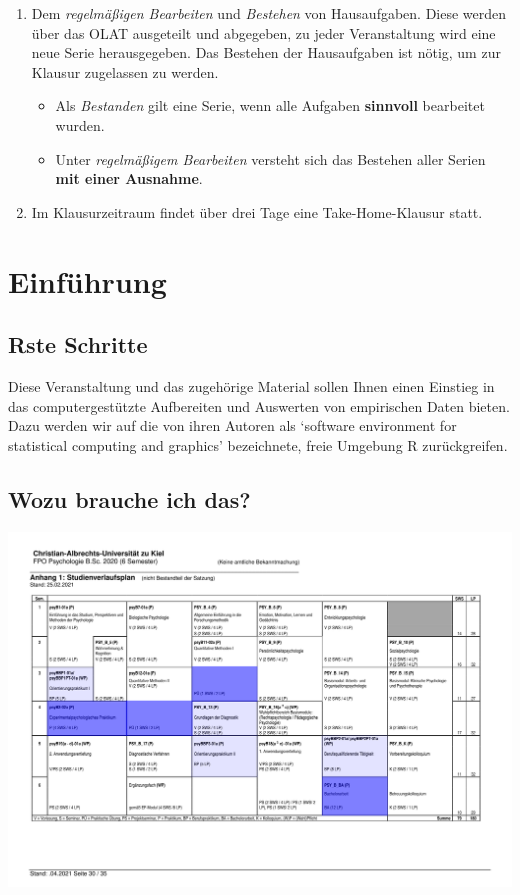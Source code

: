 \documentclass[
]{book}
\providecommand{\tightlist}{%
  \setlength{\itemsep}{0pt}\setlength{\parskip}{0pt}}
\begin{document}
\begin{enumerate}
\def\labelenumi{\arabic{enumi}.}
\tightlist
\item
  Dem \emph{regelmäßigen Bearbeiten} und \emph{Bestehen} von Hausaufgaben. Diese werden über das OLAT ausgeteilt und abgegeben, zu jeder Veranstaltung wird eine neue Serie herausgegeben. Das Bestehen der Hausaufgaben ist nötig, um zur Klausur zugelassen zu werden.

  \begin{itemize}
  \tightlist
  \item
    Als \emph{Bestanden} gilt eine Serie, wenn alle Aufgaben \textbf{sinnvoll} bearbeitet wurden.
  \item
    Unter \emph{regelmäßigem Bearbeiten} versteht sich das Bestehen aller Serien \textbf{mit einer Ausnahme}. \medskip  
  \end{itemize}
\item
  Im Klausurzeitraum findet über drei Tage eine Take-Home-Klausur statt.
\end{enumerate}

\hypertarget{einfuxfchrung}{%
\section{Einführung}\label{einfuxfchrung}}

\hypertarget{rste-schritte}{%
\subsection*{Rste Schritte}\label{rste-schritte}}

Diese Veranstaltung und das zugehörige Material sollen Ihnen einen Einstieg in das computergestützte Aufbereiten und Auswerten von empirischen Daten bieten.
Dazu werden wir auf die von ihren Autoren als `software environment for statistical computing and graphics' bezeichnete, freie Umgebung R zurückgreifen.

\hypertarget{wozu-brauche-ich-das}{%
\subsection*{Wozu brauche ich das?}\label{wozu-brauche-ich-das}}

\begin{center}\includegraphics[width=0.8\linewidth]{imgs/relevanz} \end{center}
\end{document}
